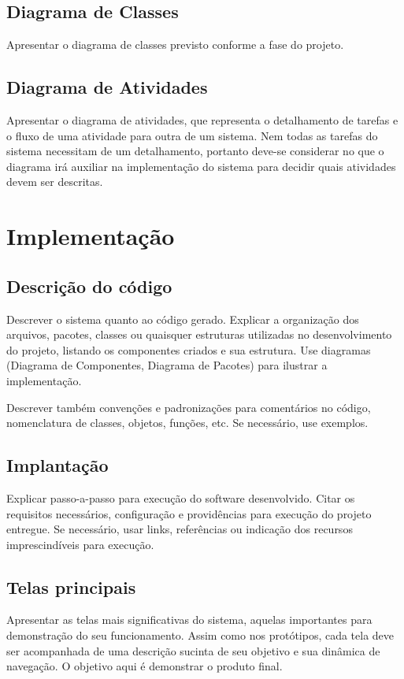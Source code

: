 \documentclass[a4paper,12pt]{article}
\begin{document}
\subsection{Diagrama de Classes}
Apresentar o diagrama de classes previsto conforme a fase do projeto.

\subsection{Diagrama de Atividades}
Apresentar o diagrama de atividades, que representa o detalhamento de tarefas e o fluxo de uma atividade para outra de um sistema. Nem todas as tarefas do sistema necessitam de um detalhamento, portanto deve-se considerar no que o diagrama irá auxiliar na implementação do sistema para decidir quais atividades devem ser descritas.

\newpage
\section{Implementação}
\subsection{Descrição do código}
Descrever o sistema quanto ao código gerado. Explicar a organização dos arquivos, pacotes, classes ou quaisquer estruturas utilizadas no desenvolvimento do projeto, listando os componentes criados e sua estrutura. Use diagramas (Diagrama de Componentes, Diagrama de Pacotes) para ilustrar a implementação.

Descrever também convenções e padronizações para comentários no código, nomenclatura de classes, objetos, funções, etc. Se necessário, use exemplos.

\subsection{Implantação}
Explicar passo-a-passo para execução do software desenvolvido. Citar os requisitos necessários, configuração e providências para execução do projeto entregue. Se necessário, usar links, referências ou indicação dos recursos imprescindíveis para execução.

\subsection{Telas principais}
Apresentar as telas mais significativas do sistema, aquelas importantes para demonstração do seu funcionamento. Assim como nos protótipos, cada tela deve ser acompanhada de uma descrição sucinta de seu objetivo e sua dinâmica de navegação. O objetivo aqui é demonstrar o produto final.
\end{document}
